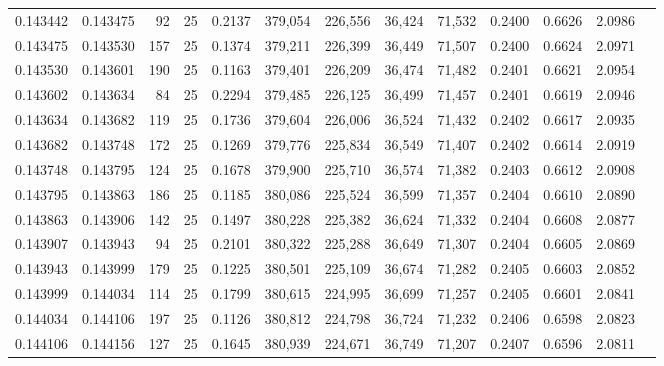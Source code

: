 \begin{tabular}{rrrrrrrrrrrrr}
0.143442 & 0.143475 &    92 &  25 &                                     0.2137 & 379,054 & 226,556 &  36,424 &  71,532 & 0.2400 & 0.6626 & 2.0986 \\
0.143475 & 0.143530 &   157 &  25 &                                     0.1374 & 379,211 & 226,399 &  36,449 &  71,507 & 0.2400 & 0.6624 & 2.0971 \\
0.143530 & 0.143601 &   190 &  25 &                                     0.1163 & 379,401 & 226,209 &  36,474 &  71,482 & 0.2401 & 0.6621 & 2.0954 \\
0.143602 & 0.143634 &    84 &  25 &                                     0.2294 & 379,485 & 226,125 &  36,499 &  71,457 & 0.2401 & 0.6619 & 2.0946 \\
0.143634 & 0.143682 &   119 &  25 &                                     0.1736 & 379,604 & 226,006 &  36,524 &  71,432 & 0.2402 & 0.6617 & 2.0935 \\
0.143682 & 0.143748 &   172 &  25 &                                     0.1269 & 379,776 & 225,834 &  36,549 &  71,407 & 0.2402 & 0.6614 & 2.0919 \\
0.143748 & 0.143795 &   124 &  25 &                                     0.1678 & 379,900 & 225,710 &  36,574 &  71,382 & 0.2403 & 0.6612 & 2.0908 \\
0.143795 & 0.143863 &   186 &  25 &                                     0.1185 & 380,086 & 225,524 &  36,599 &  71,357 & 0.2404 & 0.6610 & 2.0890 \\
0.143863 & 0.143906 &   142 &  25 &                                     0.1497 & 380,228 & 225,382 &  36,624 &  71,332 & 0.2404 & 0.6608 & 2.0877 \\
0.143907 & 0.143943 &    94 &  25 &                                     0.2101 & 380,322 & 225,288 &  36,649 &  71,307 & 0.2404 & 0.6605 & 2.0869 \\
0.143943 & 0.143999 &   179 &  25 &                                     0.1225 & 380,501 & 225,109 &  36,674 &  71,282 & 0.2405 & 0.6603 & 2.0852 \\
0.143999 & 0.144034 &   114 &  25 &                                     0.1799 & 380,615 & 224,995 &  36,699 &  71,257 & 0.2405 & 0.6601 & 2.0841 \\
0.144034 & 0.144106 &   197 &  25 &                                     0.1126 & 380,812 & 224,798 &  36,724 &  71,232 & 0.2406 & 0.6598 & 2.0823 \\
0.144106 & 0.144156 &   127 &  25 &                                     0.1645 & 380,939 & 224,671 &  36,749 &  71,207 & 0.2407 & 0.6596 & 2.0811 \\

\end{tabular}

